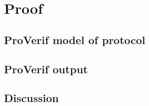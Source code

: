 \section{Proof}

\subsection{ProVerif model of protocol}


\subsection{ProVerif output}


\subsection{Discussion}
